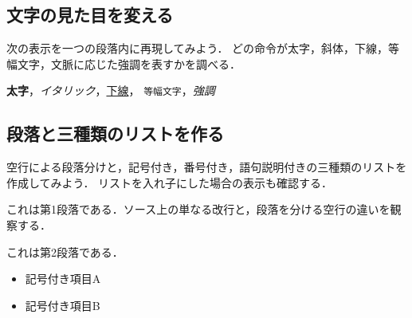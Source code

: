 \documentclass[a4paper,11pt]{jsarticle}
\begin{document}
\begin{center}
\end{center}

\subsection{文字の見た目を変える}

次の表示を一つの段落内に再現してみよう．
どの命令が太字，斜体，下線，等幅文字，文脈に応じた強調を表すかを調べる．

\begin{center}
\textbf{太字}，\textit{イタリック}，\underline{下線}，
\texttt{等幅文字}，\emph{強調}
\end{center}

\subsection{段落と三種類のリストを作る}

空行による段落分けと，記号付き，番号付き，語句説明付きの三種類のリストを作成してみよう．
リストを入れ子にした場合の表示も確認する．

これは第1段落である．ソース上の単なる改行と，段落を分ける空行の違いを観察する．

これは第2段落である．

\begin{itemize}
  \item 記号付き項目A
  \item 記号付き項目B
\end{itemize}
\end{document}

